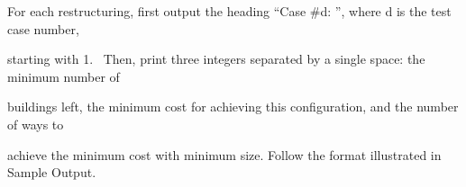 For each restructuring, first output the heading “Case \#d: ”, where d is the test case number, 

starting with 1.  Then, print three integers separated by a single space: the minimum number of 

buildings left, the minimum cost for achieving this configuration, and the number of ways to 

achieve the minimum cost with minimum size. Follow the format illustrated in Sample Output.